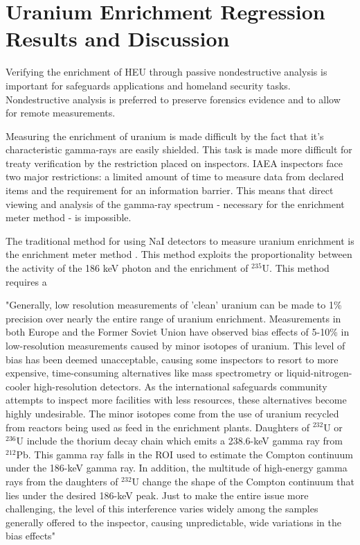\chapter{Uranium Enrichment Regression Results and Discussion}



Verifying the enrichment of HEU through passive nondestructive analysis is important for safeguards applications and homeland security tasks. Nondestructive analysis is preferred to preserve forensics evidence and to allow for remote measurements. 

Measuring the enrichment of uranium is made difficult by the fact that it's characteristic gamma-rays are easily shielded. This task is made more difficult for treaty verification by the restriction placed on inspectors. IAEA inspectors face two major restrictions: a limited amount of time to measure data from declared items and the requirement for an information barrier. This means that direct viewing and analysis of the gamma-ray spectrum - necessary for the enrichment meter method - is impossible. 

The traditional method for using NaI detectors to measure uranium enrichment is the enrichment meter method \cite{Reilly1970}. This method exploits the proportionality between the activity of the 186 keV photon and the enrichment of $^{235}$U. This method requires a 

"Generally, low resolution measurements of 'clean' uranium can be made to 1\% precision over nearly the entire range of uranium enrichment. Measurements in both Europe and the Former Soviet Union have observed bias effects of 5-10\% in low-resolution measurements caused by minor isotopes of uranium. This level of bias has been deemed unacceptable, causing some inspectors to resort to more expensive, time-consuming alternatives like mass spectrometry or liquid-nitrogen-cooler high-resolution detectors. As the international safeguards community attempts to inspect more facilities with less resources, these alternatives become highly undesirable. The minor isotopes come from the use of uranium recycled from reactors being used as feed in the enrichment plants. Daughters of $^{232}$U or $^{236}$U include the thorium decay chain which emits a 238.6-keV gamma ray from $^{212}$Pb. This gamma ray falls in the ROI used to estimate the Compton continuum under the 186-keV gamma ray. In addition, the multitude of high-energy gamma rays from the daughters of $^{232}$U change the shape of the Compton continuum that lies under the desired 186-keV peak. Just to make the entire issue more challenging, the level of this interference varies widely among the samples generally offered to the inspector, causing unpredictable, wide variations in the bias effects" \cite{SPRINKLE1997}

